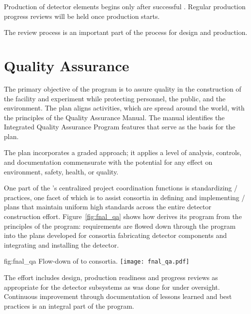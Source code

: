 Production of detector elements begins only after successful
. Regular production progress reviews will be held once
production starts. 

The review process is an important part of the  
process for design and production.

\section{Quality Assurance}
\label{sec:es-tc-qa}

The primary objective of the   program is
to assure quality in the construction of the  facility and
 experiment while protecting
 personnel, the public, and the environment. The
 plan aligns   activities, which
are spread around the world, with the principles of the \fnal Quality
Assurance Manual. The manual identifies the \fnal Integrated Quality
Assurance Program features that serve as the basis for the
  plan.

The   plan incorporates 
a graded approach; it applies a level of analysis,
controls, and documentation commensurate with the potential for any effect on
environment, safety, health, or quality.

One part of the 's centralized project
coordination functions is
standardizing / practices, one facet
of which is to assist consortia in defining and implementing
/ plans that maintain uniform high
standards across the entire detector construction
effort. Figure~\ref{fig:fnal_qa} shows how  
derives its  program from the principles of the \fnal {} program:
requirements are flowed down through the 
 program into the  plans developed for consortia fabricating detector components and integrating and installing the detector.

\begin{dunefigure}[\fnal QA]{fig:fnal_qa}
  {Flow-down of \fnal {} to consortia.}
  \texttt{[image: fnal\_qa.pdf]}
\end{dunefigure}

The  effort includes design, production readiness and
progress reviews as appropriate for the  detector
subsystems as was done for  under 
oversight. Continuous improvement through documentation of lessons learned and best practices is
an integral part of the program. 


